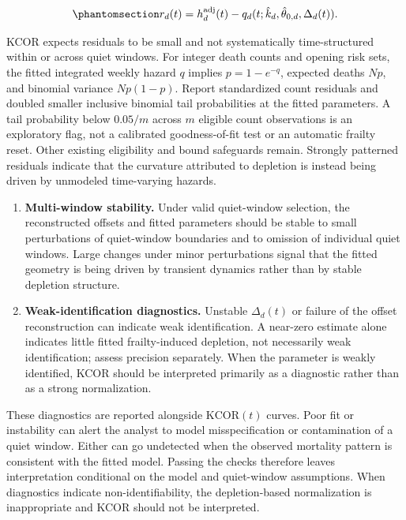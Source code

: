 \documentclass[
]{article}
\begin{document}
\begin{equation}\protect\phantomsection\label{eq:si_residuals}{r_{d}(t)=h_d^{\mathrm{adj}}(t)-q_d(t;\hat{k}_d,\hat{\theta}_{0,d},\Delta_d(t)).}\end{equation}

KCOR expects residuals to be small and not systematically time-structured within or across quiet windows. For integer death counts and opening risk sets, the fitted integrated weekly hazard \(q\) implies \(p=1-e^{-q}\), expected deaths \(Np\), and binomial variance \(Np(1-p)\). Report standardized count residuals and doubled smaller inclusive binomial tail probabilities at the fitted parameters. A tail probability below \(0.05/m\) across \(m\) eligible count observations is an exploratory flag, not a calibrated goodness-of-fit test or an automatic frailty reset. Other existing eligibility and bound safeguards remain. Strongly patterned residuals indicate that the curvature attributed to depletion is instead being driven by unmodeled time-varying hazards.

\begin{enumerate}
\def\labelenumi{\arabic{enumi}.}
\setcounter{enumi}{2}
\item
  \textbf{Multi-window stability.} Under valid quiet-window selection, the reconstructed offsets and fitted parameters should be stable to small perturbations of quiet-window boundaries and to omission of individual quiet windows. Large changes under minor perturbations signal that the fitted geometry is being driven by transient dynamics rather than by stable depletion structure.
\item
  \textbf{Weak-identification diagnostics.} Unstable \(\Delta_d(t)\) or failure of the offset reconstruction can indicate weak identification. A near-zero estimate alone indicates little fitted frailty-induced depletion, not necessarily weak identification; assess precision separately. When the parameter is weakly identified, KCOR should be interpreted primarily as a diagnostic rather than as a strong normalization.
\end{enumerate}

These diagnostics are reported alongside \(\mathrm{KCOR}(t)\) curves. Poor fit or instability can alert the analyst to model misspecification or contamination of a quiet window. Either can go undetected when the observed mortality pattern is consistent with the fitted model. Passing the checks therefore leaves interpretation conditional on the model and quiet-window assumptions. When diagnostics indicate non-identifiability, the depletion-based normalization is inappropriate and KCOR should not be interpreted.
\end{document}
